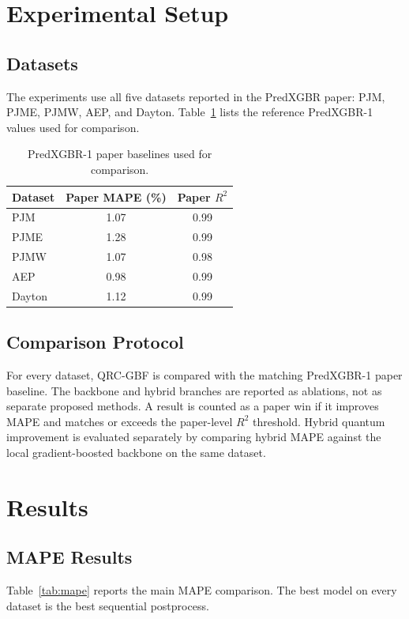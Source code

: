 \documentclass[11pt]{article}
\begin{document}
\section{Experimental Setup}
\subsection{Datasets}
The experiments use all five datasets reported in the PredXGBR paper: PJM, PJME, PJMW, AEP, and Dayton. Table~\ref{tab:paper_baselines} lists the reference PredXGBR-1 values used for comparison.

\begin{table}[H]
\centering
\caption{PredXGBR-1 paper baselines used for comparison.}
\label{tab:paper_baselines}
\begin{tabular}{lcc}
\toprule
Dataset & Paper MAPE (\%) & Paper $R^2$ \\
\midrule
PJM & 1.07 & 0.99 \\
PJME & 1.28 & 0.99 \\
PJMW & 1.07 & 0.98 \\
AEP & 0.98 & 0.99 \\
Dayton & 1.12 & 0.99 \\
\bottomrule
\end{tabular}
\end{table}

\subsection{Comparison Protocol}
For every dataset, QRC-GBF is compared with the matching PredXGBR-1 paper baseline. The backbone and hybrid branches are reported as ablations, not as separate proposed methods. A result is counted as a paper win if it improves MAPE and matches or exceeds the paper-level $R^2$ threshold. Hybrid quantum improvement is evaluated separately by comparing hybrid MAPE against the local gradient-boosted backbone on the same dataset.

\section{Results}
\subsection{MAPE Results}
Table~\ref{tab:mape} reports the main MAPE comparison. The best model on every dataset is the best sequential postprocess.
\end{document}
